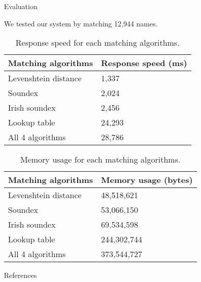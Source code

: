 \documentclass[final]{beamer}
\newlength{\sepwid}
\newlength{\onecolwid}
\newlength{\twocolwid}
\begin{document}
\begin{frame}[t]
\begin{columns}[t]
\begin{column}{\twocolwid}
\end{column} %

\begin{column}{\sepwid}\end{column} %

\begin{column}{\onecolwid} %

\begin{block}{Evaluation}

We tested our system by matching 12,944 names.

\begin{table}
\vspace{2ex}
\begin{tabular}{l l }
\toprule
\textbf{Matching algorithms} & \textbf{Response speed (ms)}\\
\midrule
Levenshtein distance & 1,337 \\
Soundex & 2,024 \\
Irish soundex & 2,456 \\
Lookup table & 24,293 \\
\midrule
All 4 algorithms & 28,786 \\
\bottomrule
\end{tabular}
\caption{Response speed for each matching algorithms.}
\end{table}
\begin{table}
\vspace{2ex}
\begin{tabular}{l l }
\toprule
\textbf{Matching algorithms} & \textbf{Memory usage (bytes)}\\
\midrule
Levenshtein distance & 48,518,621 \\
Soundex & 53,066,150 \\
Irish soundex & 69,534,598 \\
Lookup table & 244,302,744 \\
\midrule
All 4 algorithms & 373,544,727 \\
\bottomrule
\end{tabular}
\caption{Memory usage for each matching algorithms.}
\end{table}
\end{block}

\begin{block}{References}

\nocite{*} %
\small{
\vspace{0.75in}}


\end{block}
\end{column}
\end{columns}
\end{frame}
\end{document}
